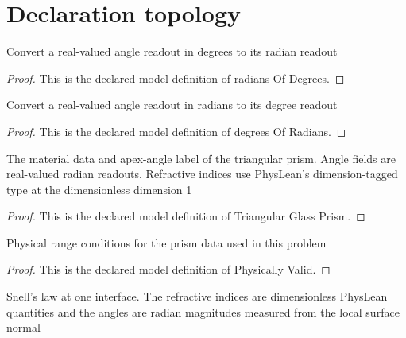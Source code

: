\section{Declaration topology}
\begin{definition}
  \label{def:physics:phyx-mini-0009:phyxminiproblems-problemphyxmini0009-radiansofdegrees}
  Convert a real-valued angle readout in degrees to its radian readout
\end{definition}
\begin{proof}
  This is the declared model definition of radians Of Degrees.
\end{proof}
\begin{definition}
  \label{def:physics:phyx-mini-0009:phyxminiproblems-problemphyxmini0009-degreesofradians}
  Convert a real-valued angle readout in radians to its degree readout
\end{definition}
\begin{proof}
  This is the declared model definition of degrees Of Radians.
\end{proof}
\begin{definition}
  \label{def:physics:phyx-mini-0009:phyxminiproblems-problemphyxmini0009-triangularglassprism}
  The material data and apex-angle label of the triangular prism. Angle fields are real-valued radian readouts. Refractive indices use PhysLean's dimension-tagged type at the dimensionless dimension 1
\end{definition}
\begin{proof}
  This is the declared model definition of Triangular Glass Prism.
\end{proof}
\begin{definition}
  \label{def:physics:phyx-mini-0009:phyxminiproblems-problemphyxmini0009-triangularglassprism-physicallyvalid}
  Physical range conditions for the prism data used in this problem
\end{definition}
\begin{proof}
  This is the declared model definition of Physically Valid.
\end{proof}
\begin{definition}
  \label{def:physics:phyx-mini-0009:phyxminiproblems-problemphyxmini0009-snelllawatinterface}
  Snell's law at one interface. The refractive indices are dimensionless PhysLean quantities and the angles are radian magnitudes measured from the local surface normal
\end{definition}
